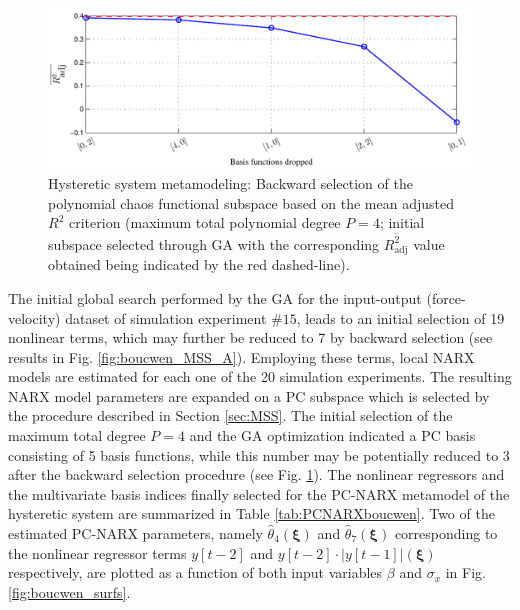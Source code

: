 \documentclass[preprint,3p,review,times,11pt]{elsarticle}
\newcommand{\bld}[1]{\boldsymbol{#1}}
\newcommand{\bxi}{\bld{\xi}}
\begin{document}
\begin{figure}[t!]
\begin{center}
\includegraphics[width = 1\textwidth]{figs/boucwen_MSS_StageB.pdf}
\caption{Hysteretic system metamodeling: Backward selection of the polynomial chaos functional subspace based on the mean adjusted $R^2$ criterion (maximum total polynomial degree $P=4$; initial subspace selected through GA with the corresponding $\overline{R^2_\text{adj}}$ value obtained being indicated by the red dashed-line).} \label{fig:boucwen_MSS_B}
\end{center}
\end{figure}


The initial global search performed by the GA for the input-output (force-velocity) dataset of simulation experiment $\#15$, leads to an initial selection of 19 nonlinear terms, which may further be reduced to 7 by backward selection (see results in Fig. \ref{fig:boucwen_MSS_A}). Employing these terms, local NARX models are estimated for each one of the 20 simulation experiments. The resulting NARX model parameters are expanded on a PC subspace which is selected by the procedure described in Section \ref{sec:MSS}. The initial selection of the maximum total degree $P=4$ and the GA optimization indicated a PC basis consisting of 5 basis functions, while this number may be potentially reduced to 3 after the backward selection procedure (see Fig. \ref{fig:boucwen_MSS_B}). The nonlinear regressors and the multivariate basis indices finally selected for the PC-NARX metamodel of the hysteretic system are summarized in Table \ref{tab:PCNARXboucwen}. Two of the estimated PC-NARX parameters, namely $\hat{\theta}_4(\bxi)$ and $\hat{\theta}_{7}(\bxi)$ corresponding to the nonlinear regressor terms $y[t-2]$ and $y[t-2]\! \cdot\!  |y[t-1]|(\bxi)$ respectively, are plotted as a function of both input variables $\beta$ and $\sigma_x$ in Fig. \ref{fig:boucwen_surfs}.
\end{document}

